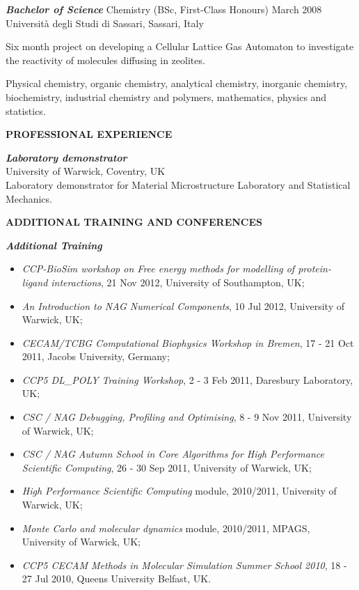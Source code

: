 \documentclass[a4paper,10pt,final]{memoir}
\newcommand{\Sep}{\vspace{1.5em}}
\newcommand{\SmallSep}{\vspace{0.5em}}
\newcommand{\CVSection}[1]
	{\Large\textbf{#1}\par
	\SmallSep\normalsize\normalfont}
\newcommand{\CVItem}[2]
	{\textit{\textbf{\color{RoyalBlue} #1}} #2}
\begin{document}
\CVItem{Bachelor of Science}{Chemistry (BSc, First-Class Honours) \hfill  March 2008}\\
Universit\`a degli Studi di Sassari, Sassari, Italy %
\begin{description} [style=multiline,leftmargin=3cm,font=\normalfont] \itemsep -2pt
\item [Thesis:] Six month project on developing a Cellular Lattice Gas Automaton to investigate
the reactivity of molecules diffusing in zeolites.
\item[Main subjects:] Physical chemistry, organic chemistry, analytical chemistry,
  inorganic chemistry, biochemistry, industrial chemistry and polymers, mathematics,
  physics and statistics.
\end{description}


\Sep
\CVSection{PROFESSIONAL EXPERIENCE} 
\CVItem{Laboratory demonstrator} \\ %
University of Warwick, Coventry, UK  \\
Laboratory demonstrator for Material Microstructure Laboratory and Statistical Mechanics. 

\Sep
\CVSection{ADDITIONAL TRAINING AND CONFERENCES} 
\CVItem{Additional Training} 
\begin{itemize} \itemsep -2pt %
\item \textit{CCP-BioSim workshop on Free energy methods for modelling of protein-ligand
  interactions}, 21 Nov 2012, University of Southampton, UK;
\item \textit{An Introduction to NAG Numerical Components}, 10 Jul 2012, University of Warwick, UK;
\item \textit{CECAM/TCBG Computational Biophysics Workshop in Bremen},  17 - 21 Oct 2011, Jacobs University, Germany;  
\item \textit{CCP5 DL\_POLY Training Workshop}, 2 - 3 Feb 2011, Daresbury
Laboratory, UK;
\item \textit{CSC / NAG Debugging, Profiling and Optimising},  8 - 9 Nov 2011, University of
  Warwick, UK;
\item \textit{CSC / NAG Autumn School in Core Algorithms for High Performance Scientific
  Computing}, 26 - 30 Sep 2011, University of Warwick, UK;
\item \textit{High Performance Scientific Computing} module, 2010/2011, University of Warwick, UK;
\item \textit{Monte Carlo and molecular dynamics} module, 2010/2011, MPAGS, University of Warwick, UK;
\item \textit{CCP5 CECAM Methods in Molecular Simulation Summer School 2010}, 18 - 27 Jul 2010, Queens University
  Belfast, UK.
\end{itemize}
\SmallSep
\end{document}
